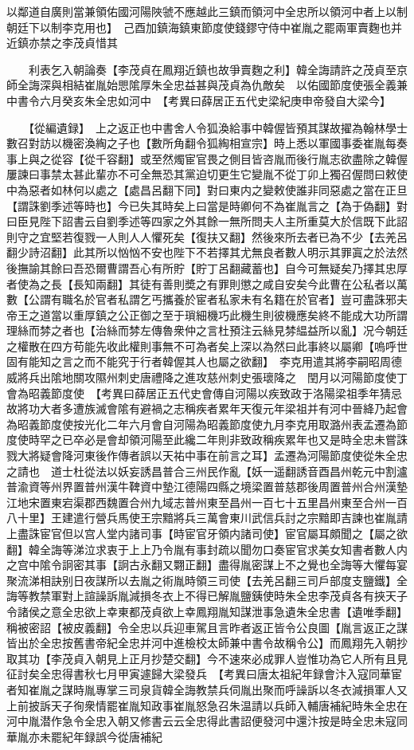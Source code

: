 以鄰道自廣則當兼領佑國河陽陜虢不應越此三鎮而領河中全忠所以領河中者上以制朝廷下以制李克用也】　己酉加鎮海鎮東節度使錢鏐守侍中崔胤之罷兩軍賣麴也并近鎮亦禁之李茂貞惜其

　　利表乞入朝論奏【李茂貞在鳳翔近鎮也故爭賣麴之利】韓全誨請許之茂貞至京師全誨深與相結崔胤始愳隂厚朱全忠益甚與茂貞為仇敵矣　以佑國節度使張全義兼中書令六月癸亥朱全忠如河中　【考異曰薛居正五代史梁紀庚申帝發自大梁今】

　　【從編遺録】　上之返正也中書舍人令狐渙給事中韓偓皆預其謀故擢為翰林學士數召對訪以機密渙綯之子也【數所角翻令狐綯相宣宗】時上悉以軍國事委崔胤每奏事上與之從容【從千容翻】或至然燭宦官畏之側目皆咨胤而後行胤志欲盡除之韓偓屢諫曰事禁太甚此輩亦不可全無恐其黨迫切更生它變胤不從丁卯上獨召偓問曰敕使中為惡者如林何以處之【處昌呂翻下同】對曰東内之變敕使誰非同惡處之當在正旦【謂誅劉季述等時也】今已失其時矣上曰當是時卿何不為崔胤言之【為于偽翻】對曰臣見陛下詔書云自劉季述等四家之外其餘一無所問夫人主所重莫大於信既下此詔則守之宜堅若復戮一人則人人懼死矣【復扶又翻】然後來所去者已為不少【去羌呂翻少詩沼翻】此其所以忷忷不安也陛下不若擇其尤無良者數人明示其罪寘之於法然後撫諭其餘曰吾恐爾曹謂吾心有所貯【貯丁呂翻藏蓄也】自今可無疑矣乃擇其忠厚者使為之長【長知兩翻】其徒有善則奬之有罪則懲之咸自安矣今此曹在公私者以萬數【公謂有職名於官者私謂乞丐攜養於宦者私家未有名籍在於官者】豈可盡誅邪夫帝王之道當以重厚鎮之公正御之至于瑣細機巧此機生則彼機應矣終不能成大功所謂理絲而棼之者也【治絲而棼左傳魯衆仲之言杜預注云絲見棼緼益所以亂】况今朝廷之權散在四方苟能先收此權則事無不可為者矣上深以為然曰此事終以屬卿【嗚呼世固有能知之言之而不能究于行者韓偓其人也屬之欲翻】　李克用遣其將李嗣昭周德威將兵出隂地關攻隰州刺史唐禮降之進攻慈州刺史張瓌降之　閏月以河陽節度使丁會為昭義節度使　【考異曰薛居正五代史會傳自河陽以疾致政于洛陽梁祖季年猜忌故將功大者多遭族滅會隂有避禍之志稱疾者累年天復元年梁祖并有河中晉絳乃起會為昭義節度使按光化二年六月會自河陽為昭義節度使九月李克用取潞州表孟遷為節度使時罕之已卒必是會却領河陽至此纔二年則非致政稱疾累年也又是時全忠未嘗誅戮大將疑會降河東後作傳者誤以天祐中事在前言之耳】孟遷為河陽節度使從朱全忠之請也　道士杜從法以妖妄誘昌普合三州民作亂【妖一遥翻誘音酉昌州乾元中割瀘普渝資等州界置普州漢牛鞞資中墊江德陽四縣之境梁置普慈郡後周置普州合州漢墊江地宋置東宕渠郡西魏置合州九域志普州東至昌州一百七十五里昌州東至合州一百八十里】王建遣行營兵馬使王宗黯將兵三萬會東川武信兵討之宗黯即吉諫也崔胤請上盡誅宦官但以宫人堂内諸司事【時宦官牙領内諸司使】宦官屬耳頗聞之【屬之欲翻】韓全誨等涕泣求衷于上上乃令胤有事封疏以聞勿口奏宦官求美女知書者數人内之宫中隂令詗密其事【詗古永翻又翾正翻】盡得胤密謀上不之覺也全誨等大懼每宴聚流涕相訣别日夜謀所以去胤之術胤時領三司使【去羌呂翻三司戶部度支鹽鐵】全誨等教禁軍對上諠譟訴胤減損冬衣上不得已解胤鹽銕使時朱全忠李茂貞各有挾天子令諸侯之意全忠欲上幸東都茂貞欲上幸鳳翔胤知謀泄事急遺朱全忠書【遺唯季翻】稱被密詔【被皮義翻】令全忠以兵迎車駕且言昨者返正皆令公良圖【胤言返正之謀皆出於全忠按舊書帝紀全忠并河中進檢校太師兼中書令故稱令公】而鳳翔先入朝抄取其功【李茂貞入朝見上正月抄楚交翻】今不速來必成罪人豈惟功為它人所有且見征討矣全忠得書秋七月甲寅遽歸大梁發兵　【考異曰唐太祖紀年録會汴入寇同華宦者知崔胤之謀時胤專掌三司泉貨韓全誨教禁兵伺胤出聚而呼譟訴以冬衣減損軍人又上前披訴天子徇衆情罷崔胤知政事崔胤怒急召朱温請以兵師入輔唐補紀時朱全忠在河中胤潜作急令全忠入朝又修書云云全忠得此書詔便發河中還汴按是時全忠未寇同華胤亦未罷紀年録誤今從唐補紀